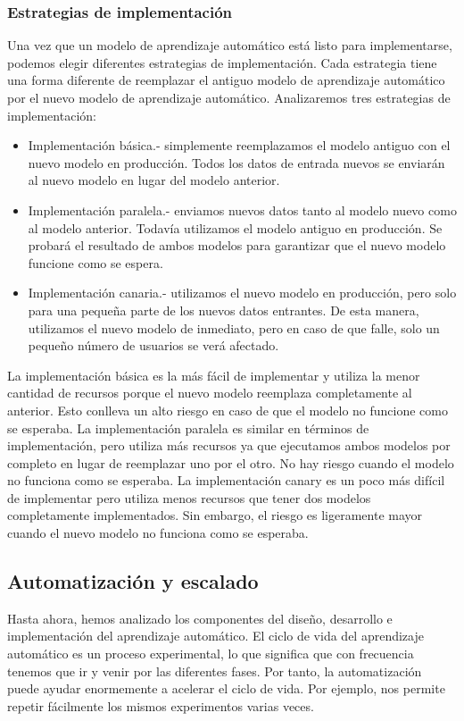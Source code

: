 \documentclass[10pt]{book}
\begin{document}
\subsubsection{Estrategias de implementación}
Una vez que un modelo de aprendizaje automático está listo para implementarse, podemos elegir diferentes estrategias de implementación. Cada estrategia tiene una forma diferente de reemplazar el antiguo modelo de aprendizaje automático por el nuevo modelo de aprendizaje automático. Analizaremos tres estrategias de implementación: 
\begin{itemize}
	\item Implementación básica.- simplemente reemplazamos el modelo antiguo con el nuevo modelo en producción. Todos los datos de entrada nuevos se enviarán al nuevo modelo en lugar del modelo anterior.
	\item Implementación paralela.- enviamos nuevos datos tanto al modelo nuevo como al modelo anterior. Todavía utilizamos el modelo antiguo en producción. Se probará el resultado de ambos modelos para garantizar que el nuevo modelo funcione como se espera.
	\item Implementación canaria.- utilizamos el nuevo modelo en producción, pero solo para una pequeña parte de los nuevos datos entrantes. De esta manera, utilizamos el nuevo modelo de inmediato, pero en caso de que falle, solo un pequeño número de usuarios se verá afectado.
\end{itemize}

La implementación básica es la más fácil de implementar y utiliza la menor cantidad de recursos porque el nuevo modelo reemplaza completamente al anterior. Esto conlleva un alto riesgo en caso de que el modelo no funcione como se esperaba. La implementación paralela es similar en términos de implementación, pero utiliza más recursos ya que ejecutamos ambos modelos por completo en lugar de reemplazar uno por el otro. No hay riesgo cuando el modelo no funciona como se esperaba. La implementación canary es un poco más difícil de implementar pero utiliza menos recursos que tener dos modelos completamente implementados. Sin embargo, el riesgo es ligeramente mayor cuando el nuevo modelo no funciona como se esperaba.

\subsection{Automatización y escalado}
Hasta ahora, hemos analizado los componentes del diseño, desarrollo e implementación del aprendizaje automático. El ciclo de vida del aprendizaje automático es un proceso experimental, lo que significa que con frecuencia tenemos que ir y venir por las diferentes fases. Por tanto, la automatización puede ayudar enormemente a acelerar el ciclo de vida. Por ejemplo, nos permite repetir fácilmente los mismos experimentos varias veces.
\end{document}
